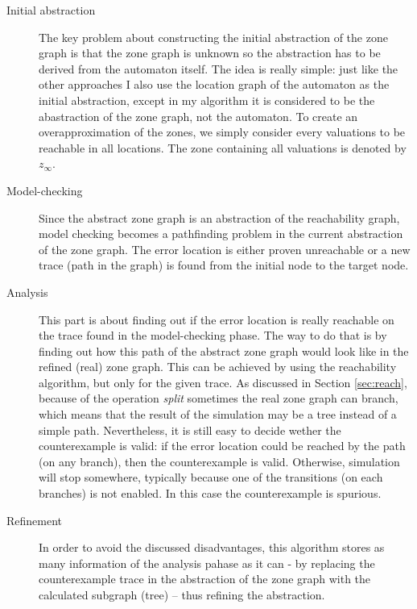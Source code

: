  \begin{description}
 	\item[Initial abstraction] The key problem about constructing the initial abstraction of the zone graph is that the zone graph is unknown so the abstraction has to be derived from the automaton itself. The idea is really simple: just like the other approaches I also use the location graph of the automaton as the initial abstraction, except in my algorithm it is considered to be the abastraction of the zone graph, not the automaton. To create an overapproximation of the zones, we simply consider every valuations to be reachable in all locations. The zone containing all valuations is denoted by $z_\infty$.
 	\item[Model-checking] Since the abstract zone graph is an abstraction of the reachability graph, model checking becomes a pathfinding problem in the current abstraction of the zone graph. The error location is either proven unreachable or a new trace (path in the graph) is found from the initial node to the target node.
 	\item[Analysis] This part is about finding out if the error location is really reachable on the trace found in the model-checking phase. The way to do that is by finding out how this path of the abstract zone graph would look like in the refined (real) zone graph. This can be achieved by using the reachability algorithm, but only for the given trace. As discussed in Section \ref{sec:reach}, because of the operation \emph{split} sometimes the real zone graph can branch, which means that the result of the simulation may be a tree instead of a simple path. Nevertheless, it is still easy to decide wether the counterexample is valid: if the error location could be reached by the path (on any branch), then the counterexample is valid. Otherwise, simulation will stop somewhere, typically because one of the transitions (on each branches) is not enabled. In this case the counterexample is spurious.
 	\item[Refinement] In order to avoid the discussed disadvantages, this algorithm stores as many information of the analysis pahase as it can - by replacing the counterexample trace in the abstraction of the zone graph with the calculated subgraph (tree) -- thus refining the abstraction.
 \end{description}

